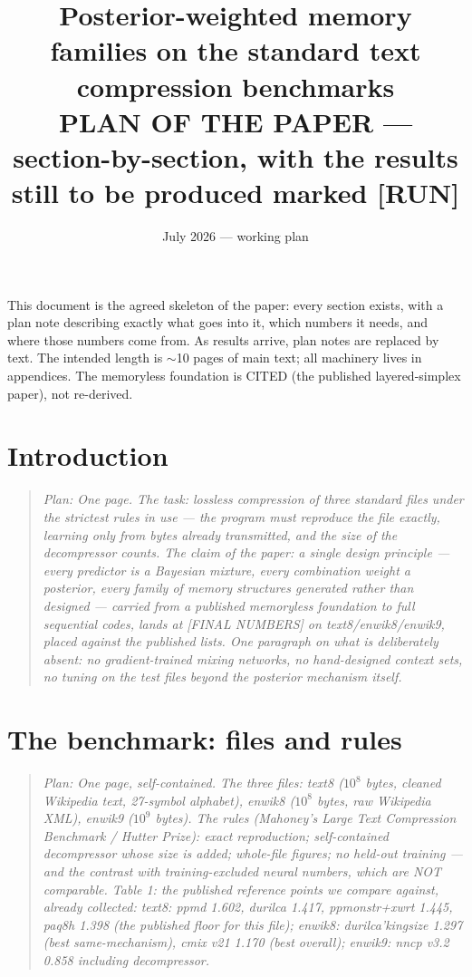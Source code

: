 \documentclass[11pt]{article}
\title{Posterior-weighted memory families on the standard text
compression benchmarks\\
\large PLAN OF THE PAPER --- section-by-section, with the results
still to be produced marked [RUN]}
\author{}
\date{July 2026 --- working plan}
\newcommand{\planned}[1]{\begin{quote}\small\itshape Plan: #1\end{quote}}
\begin{document}
\maketitle

\noindent
This document is the agreed skeleton of the paper: every section
exists, with a plan note describing exactly what goes into it, which
numbers it needs, and where those numbers come from.  As results
arrive, plan notes are replaced by text.  The intended length is
$\sim$10 pages of main text; all machinery lives in appendices.  The
memoryless foundation is CITED (the published layered-simplex paper),
not re-derived.

\section{Introduction}
\planned{One page.  The task: lossless compression of three standard
files under the strictest rules in use --- the program must reproduce
the file exactly, learning only from bytes already transmitted, and
the size of the decompressor counts.  The claim of the paper: a
single design principle --- every predictor is a Bayesian mixture,
every combination weight a posterior, every family of memory
structures generated rather than designed --- carried from a published
memoryless foundation to full sequential codes, lands at [FINAL
NUMBERS] on text8/enwik8/enwik9, placed against the published lists.
One paragraph on what is deliberately absent: no gradient-trained
mixing networks, no hand-designed context sets, no tuning on the test
files beyond the posterior mechanism itself.}

\section{The benchmark: files and rules}
\planned{One page, self-contained.  The three files: text8 ($10^8$
bytes, cleaned Wikipedia text, 27-symbol alphabet), enwik8 ($10^8$
bytes, raw Wikipedia XML), enwik9 ($10^9$ bytes).  The rules
(Mahoney's Large Text Compression Benchmark / Hutter Prize): exact
reproduction; self-contained decompressor whose size is added;
whole-file figures; no held-out training --- and the contrast with
training-excluded neural numbers, which are NOT comparable.  Table 1:
the published reference points we compare against, already collected:
text8: ppmd 1.602, durilca 1.417, ppmonstr+xwrt 1.445, paq8h 1.398
(the published floor for this file); enwik8: durilca'kingsize 1.297
(best same-mechanism), cmix v21 1.170 (best overall); enwik9: nncp
v3.2 0.858 including decompressor.}
\end{document}
